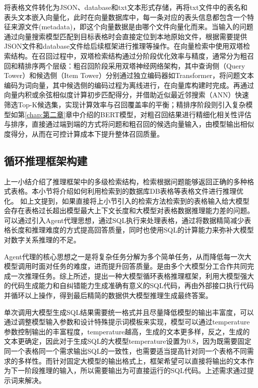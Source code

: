 将表格文件转化为JSON、database和txt文本形式存储，再将txt文件中的表名和表头文本嵌入向量化，此时在向量数据库中，每一条对应的表头信息都包含一个特征来源文件(metadata)，即这个向量数据是由哪个文件向量化而来。当输入的问题通过向量搜索模型匹配到目标表格时会直接定位到本地原始文件，根据需要提供JSON文件和database文件给后续框架进行推理等操作。在向量检索中使用双塔检索结构\cite{bahdanau2015neural,sutskever2014sequence,fan2018hierarchical,holtzmancurious}。在召回过程中，双塔检索结构通过分阶段优化效率与精度，通常分为粗召回和精排序两个层级：粗召回阶段采用双塔神经网络架构，其中查询侧（Query Tower）和候选侧（Item Tower）分别通过独立编码器如Transformer，将问题文本编码为词向量，其中候选侧的编码过程为离线进行，在向量库构建时完成。再通过向量内积或余弦相似度计算初步匹配得分，并借助近似最近邻搜索（ANN）快速筛选Top-K候选集，实现计算效率与召回覆盖率的平衡；精排序阶段则引入复杂模型如第\ref{chap:第二章}章中介绍的BERT模型，对粗召回结果进行精细化相关性评估与排序，直接通过端到端的方式将问题和粗召回的候选向量输入，由模型输出相似度得分，从而在可控计算成本下提升整体召回质量。

\subsection{循环推理框架构建}
上一小结介绍了推理框架中的多级检索结构，检索根据问题能够返回正确的多种格式表格。本小节将介绍如何利用检索到的数据库DB表格等表格文件进行推理优化。
如上文提到，如果直接将上小节引入的检索方法检索到的表格输入给大模型会存在表格过长超出模型最大上下文长度和大模型对表格数据推理能力差的问题。可以通过引入Agent代理思想，通过SQL执行来处理表格，通过将数据精简减少表格长度和推理难度的方式提高回答质量，同时也使用SQL的计算能力来弥补大模型对数字关系推理的不足。

Agent代理的核心思想之一是将复杂任务分解为多个简单任务，从而降低每一次大模型调用时面对任务的难度，进而提升回答质量。是由多个大模型分工合作共同完成一次推理任务。综上所述，提出一种大模型循环表格推理框架，利用大模型强大的代码生成能力和自纠错能力生成准确有意义的SQL代码，再由外部接口执行代码并循环以上操作，得到最后精简的数据供大模型推理生成最终答案。

单次调用大模型生成SQL结果需要统一格式并且尽量降低模型的输出丰富度，可以通过调整模型输入参数和设计特殊提示词模板来实现，模型可以通过temperature参数控制输出的丰富程度，temperature越高，生成的文本更多样，反之，生成的文本更确定，因此对于生成SQL的大模型temperature设置为0.8，因为既需要固定同一个表格同一个需求输出SQL的一致性，也需要适当提高针对同一个表格不同需求的多样性。而针对固定大模型的输出格式上，框架希望可以直接将输出的文本作为下一阶段推理的输入，所以需要输出为可直接运行的SQL代码。上述需求通过提示词来解决。

